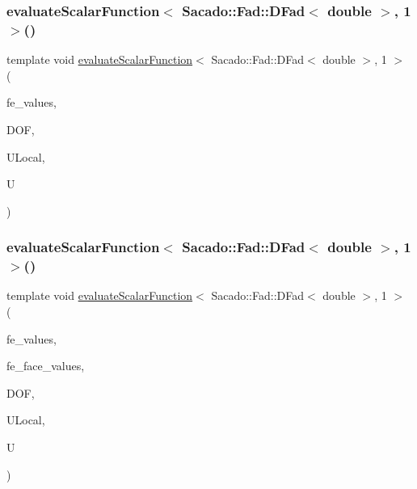 \mbox{\label{function_evaluations_8cc_a6856c1b1b83231bc778cecda3950533d}} 
\subsubsection{\texorpdfstring{evaluateScalarFunction$<$ Sacado::Fad::DFad$<$ double $>$, 1 $>$()}{evaluateScalarFunction< Sacado::Fad::DFad< double >, 1 >()}\hspace{0.1cm}{\footnotesize\ttfamily [1/2]}}
{\footnotesize\ttfamily template void \mbox{\hyperlink{group___evaluation_functions_ga2e2fbeb2173113c6889c73bbb7304789}{evaluate\+Scalar\+Function}}$<$ Sacado\+::\+Fad\+::\+D\+Fad$<$ double $>$, 1 $>$ (\begin{DoxyParamCaption}\item[{const F\+E\+Values$<$ 1 $>$ \&}]{fe\+\_\+values,  }\item[{unsigned int}]{D\+OF,  }\item[{Table$<$ 1, Sacado\+::\+Fad\+::\+D\+Fad$<$ double $>$$>$ \&}]{U\+Local,  }\item[{Table$<$ 1, Sacado\+::\+Fad\+::\+D\+Fad$<$ double $>$$>$ \&}]{U }\end{DoxyParamCaption})}

\mbox{\label{function_evaluations_8cc_aba734fcd49b3387c248667715e27f4d8}} 
\subsubsection{\texorpdfstring{evaluateScalarFunction$<$ Sacado::Fad::DFad$<$ double $>$, 1 $>$()}{evaluateScalarFunction< Sacado::Fad::DFad< double >, 1 >()}\hspace{0.1cm}{\footnotesize\ttfamily [2/2]}}
{\footnotesize\ttfamily template void \mbox{\hyperlink{group___evaluation_functions_ga2e2fbeb2173113c6889c73bbb7304789}{evaluate\+Scalar\+Function}}$<$ Sacado\+::\+Fad\+::\+D\+Fad$<$ double $>$, 1 $>$ (\begin{DoxyParamCaption}\item[{const F\+E\+Values$<$ 1 $>$ \&}]{fe\+\_\+values,  }\item[{const F\+E\+Face\+Values$<$ 1 $>$ \&}]{fe\+\_\+face\+\_\+values,  }\item[{unsigned int}]{D\+OF,  }\item[{Table$<$ 1, Sacado\+::\+Fad\+::\+D\+Fad$<$ double $>$$>$ \&}]{U\+Local,  }\item[{Table$<$ 1, Sacado\+::\+Fad\+::\+D\+Fad$<$ double $>$$>$ \&}]{U }\end{DoxyParamCaption})}

